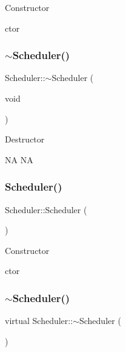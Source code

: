 Constructor

ctor \mbox{\label{classScheduler_afc8187779b46f64039d3ffa58f0dbe51}} 
\subsubsection{\texorpdfstring{$\sim$\+Scheduler()}{~Scheduler()}\hspace{0.1cm}{\footnotesize\ttfamily [1/2]}}
{\footnotesize\ttfamily Scheduler\+::$\sim$\+Scheduler (\begin{DoxyParamCaption}\item[{void}]{ }\end{DoxyParamCaption})\hspace{0.3cm}{\ttfamily [virtual]}}

Destructor

NA  NA \mbox{\label{classScheduler_a3b61aac11466cd45ae42ab8c2b0013f6}} 
\subsubsection{\texorpdfstring{Scheduler()}{Scheduler()}\hspace{0.1cm}{\footnotesize\ttfamily [2/2]}}
{\footnotesize\ttfamily Scheduler\+::\+Scheduler (\begin{DoxyParamCaption}{ }\end{DoxyParamCaption})}

Constructor

ctor \mbox{\label{classScheduler_a900bd7768c2580dbc3a08c2873aa6086}} 
\subsubsection{\texorpdfstring{$\sim$\+Scheduler()}{~Scheduler()}\hspace{0.1cm}{\footnotesize\ttfamily [2/2]}}
{\footnotesize\ttfamily virtual Scheduler\+::$\sim$\+Scheduler (\begin{DoxyParamCaption}{ }\end{DoxyParamCaption})\hspace{0.3cm}{\ttfamily [virtual]}}

